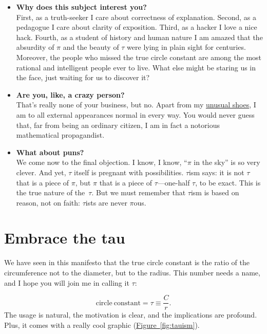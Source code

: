 \documentclass{article}
\begin{document}
\begin{itemize}
  \item \textbf{Why does this subject interest you?} \\ First, as a truth-seeker I care about correctness of explanation. Second, as a pedagogue I care about clarity of exposition. Third, as a hacker I love a nice hack. Fourth, as a student of history and human nature I am amazed that the absurdity of $\pi$ and the beauty of $\tau$ were lying in plain sight for centuries. Moreover, the people who missed the true circle constant are among the most rational and intelligent people ever to live. What else might be staring us in the face, just waiting for us to discover it?
  
  \item \textbf{Are you, like, a crazy person?} \\ That's really none of your business, but no. Apart from my \href{http://www.vibramfivefingers.com/}{unusual shoes}, I am to all external appearances normal in every way. You would never guess that, far from being an ordinary citizen, I am in fact a notorious mathematical propagandist.
  
  \item \textbf{What about puns?} \\ We come now to the final objection. I know, I know, ``$\pi$ in the sky'' is so very clever. And yet, $\tau$ itself is pregnant with possibilities. $\tau$ism says: it is not $\tau$ that is a piece of $\pi$, but $\pi$ that is a piece of $\tau$---one-half $\tau$, to be exact. This is the true nature of the~$\tau$. But we must remember that $\tau$ism is based on reason, not on faith: $\tau$ists are never $\pi$ous.

\end{itemize}


\section{Embrace the tau}

We have seen in this manifesto that the true circle constant is the ratio of the circumference not to the diameter, but to the radius. This number needs a name, and I hope you will join me in calling it $\tau$:

\[
  \mathrm{circle\ constant} = \tau \equiv \frac{C}{r}.
\]
The usage is natural, the motivation is clear, and the implications are profound. Plus, it comes with a really cool graphic (\hyperref[fig:tauism]{Figure~}\ref{fig:tauism}).
\end{document}
